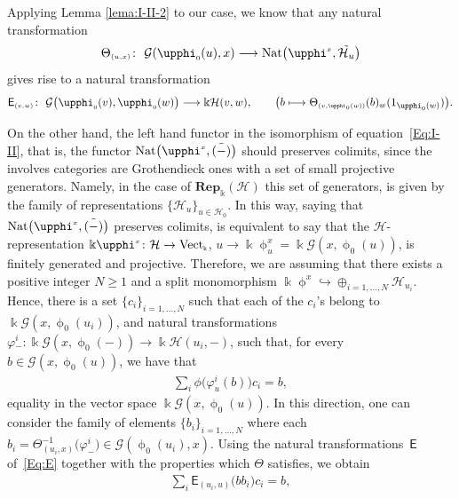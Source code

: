 \documentclass[10pt,a4paper]{amsart}
\numberwithin{equation}{section}
\newcommand{\Sf}[1]{\mathsf{#1}}
\newcommand{\Rep}[1]{\mathbf{Rep}_{\Sscript{\Bbbk}}(#1)}
\newcommand{\Vect}{{\rm Vect}_{\Sscript{\Bbbk}}}
\newcommand{\Ho}{\cH_{\Sscript{0}}}
\newcommand{\cG}{{\mathcal G}}
\newcommand{\cH}{{\mathcal H}}
\newcommand{\Sscript}[1]{\scriptscriptstyle{#1}}
\newcommand{\phio}{\upphi_{\Sscript{0}}}
\begin{document}
Applying Lemma \ref{lema:I-II-2} to our case, we know that any natural transformation
\begin{gather*}
\Theta_{\Sscript{(u,x)}}\colon \ \cG(\phio(u),x) \longrightarrow {\rm Nat}\big( \upphi^{\Sscript{x}}, \tilde{\cH_{u}}\big)
\end{gather*}
gives rise to a natural transformation
\begin{gather}\label{Eq:E}
{\sf{E}}_{\Sscript{(v,w)}}\colon \ \cG\big(\phio(v),\phio(w)\big) \longrightarrow \Bbbk\cH(v,w), \qquad \big( b \longmapsto \Theta_{\Sscript{(v,\phio(w))}}(b){}_{w}(1_{\phio(w)}) \big).
\end{gather}

On the other hand, the left hand functor in the isomorphism of equation~\eqref{Eq:I-II}, that is, the functor ${\rm Nat}\big(\upphi^{\Sscript{x}}, \tilde{(-)}\big)$ should preserves colimits, since the involves categories are Grothendieck ones with a set of small projective generators. Namely, in the case of $\Rep{\cH}$ this set of generators, is given by the family of representations $\{ \cH_{\Sscript{u}}\}_{\Sscript{u \in \Ho}}$. In this way, saying that ${\rm Nat}\big(\upphi^{\Sscript{x}}, \tilde{(-)}\big)$ preserves colimits, is equivalent to say that the $\cH$-representation $\Bbbk \upphi^{\Sscript{x}}\colon \cH \to \Vect$, $u \to \Bbbk \upphi^{\Sscript{x}}_{\Sscript{u}}=\Bbbk\cG(x,\phio(u))$, is finitely generated and projective. Therefore, we are assuming that there exists a positive integer $N \geq 1$ and a split monomorphism $\Bbbk \upphi^{\Sscript{x}} \hookrightarrow \oplus_{i =1,\dots, N} \cH_{\Sscript{u_{i}}}$. Hence, there is a set $\{ c_{i}\}_{\Sscript{i =1,\dots, N}}$ such that each of the $c_{i}$'s belong to $\Bbbk \cG(x, \phio(u_{i}))$, and natural transformations $\varphi{}^{i}_{-}\colon \Bbbk \cG(x,\phio(-)) \to \Bbbk \cH(u_{i},-)$, such that, for every $b \in \cG(x,\phio(u))$, we have that
\begin{gather*}
\sum_{i} \phi\big( \varphi^{i}_{u}(b) \big) c_{i} = b,
\end{gather*}
equality in the vector space $ \Bbbk\cG(x,\phio(u))$. In this direction, one can consider the family of elements $\{b_{i}\}_{\Sscript{i= 1,\dots, N}}$ where each $b_{i} = \Theta_{(u_{i}, x)}^{-1}\big( \varphi^{i}_{-}\big) \in \cG(\phio(u_{i}),x)$. Using the natural transformations~$\Sf{E}$ of~\eqref{Eq:E} together with the properties which $\Theta$ satisfies, we obtain
\begin{gather*}
\sum_{i} \Sf{E}_{\Sscript{(u_{i}, u)}} \big( bb_{i}\big) c_{i} = b,
\end{gather*}
\end{document}
